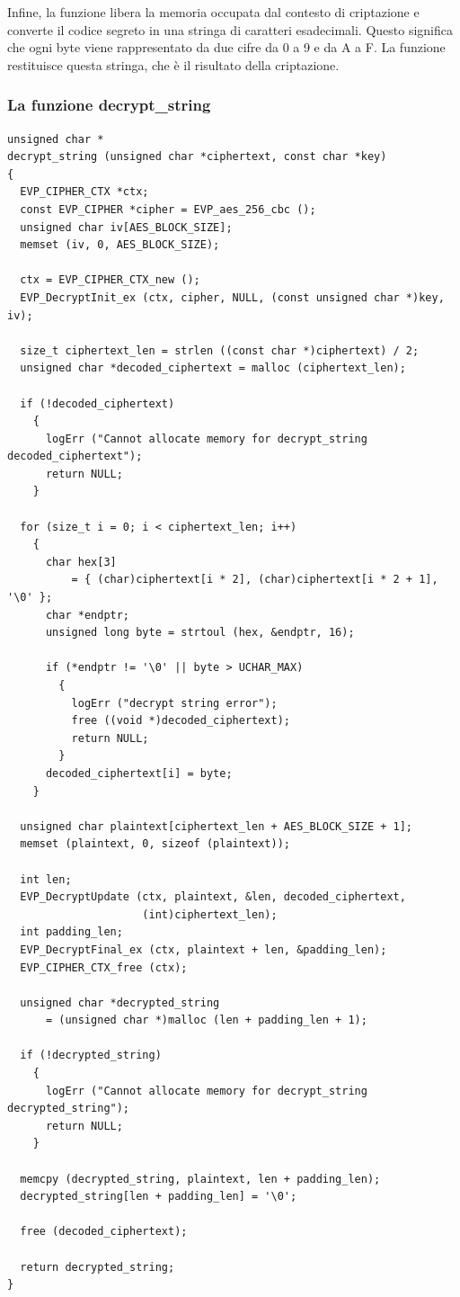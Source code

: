 Infine, la funzione libera la memoria occupata dal contesto di criptazione e converte il codice segreto in una stringa di caratteri esadecimali. Questo significa che ogni byte viene rappresentato da due cifre da 0 a 9 e da A a F. La funzione restituisce questa stringa, che è il risultato della criptazione.

\subsubsection{La funzione decrypt\_string}

\begin{lstlisting}[style=C, caption=Funzione decrypt\_string, label=C-dec-string.h]
unsigned char *
decrypt_string (unsigned char *ciphertext, const char *key)
{
  EVP_CIPHER_CTX *ctx;
  const EVP_CIPHER *cipher = EVP_aes_256_cbc ();
  unsigned char iv[AES_BLOCK_SIZE];
  memset (iv, 0, AES_BLOCK_SIZE);

  ctx = EVP_CIPHER_CTX_new ();
  EVP_DecryptInit_ex (ctx, cipher, NULL, (const unsigned char *)key, iv);

  size_t ciphertext_len = strlen ((const char *)ciphertext) / 2;
  unsigned char *decoded_ciphertext = malloc (ciphertext_len);

  if (!decoded_ciphertext)
    {
      logErr ("Cannot allocate memory for decrypt_string decoded_ciphertext");
      return NULL;
    }

  for (size_t i = 0; i < ciphertext_len; i++)
    {
      char hex[3]
          = { (char)ciphertext[i * 2], (char)ciphertext[i * 2 + 1], '\0' };
      char *endptr;
      unsigned long byte = strtoul (hex, &endptr, 16);

      if (*endptr != '\0' || byte > UCHAR_MAX)
        {
          logErr ("decrypt string error");
          free ((void *)decoded_ciphertext);
          return NULL;
        }
      decoded_ciphertext[i] = byte;
    }

  unsigned char plaintext[ciphertext_len + AES_BLOCK_SIZE + 1];
  memset (plaintext, 0, sizeof (plaintext));

  int len;
  EVP_DecryptUpdate (ctx, plaintext, &len, decoded_ciphertext,
                     (int)ciphertext_len);
  int padding_len;
  EVP_DecryptFinal_ex (ctx, plaintext + len, &padding_len);
  EVP_CIPHER_CTX_free (ctx);

  unsigned char *decrypted_string
      = (unsigned char *)malloc (len + padding_len + 1);

  if (!decrypted_string)
    {
      logErr ("Cannot allocate memory for decrypt_string decrypted_string");
      return NULL;
    }

  memcpy (decrypted_string, plaintext, len + padding_len);
  decrypted_string[len + padding_len] = '\0';

  free (decoded_ciphertext);

  return decrypted_string;
}
\end{lstlisting}
